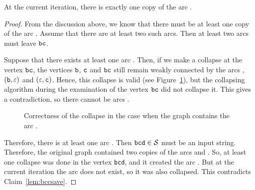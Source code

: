 \begin{lemma}
\label{lem:bbcone}
At the current iteration, there is exactly one copy of the arc .
\end{lemma}
\begin{proof}
From the discussion above, we know that there must be at least one copy of the arc . Assume that there are at least two such arcs. Then at least two arcs must leave $ {\tt bc} $.

Suppose that there exists at least one arc . Then, if we make a collapse at the vertex $ {\tt bc} $, the vertices $ {\tt b} $, $ {\tt c} $ and $ {\tt bc} $ still remain weakly connected by the arcs , $ ({\tt b}, \varepsilon) $ and $ (\varepsilon, {\tt c}) $. Hence, this collapse is valid (see Figure~\ref{fig:lvl1lemmabcc}), but the collapsing algorithm during the examination of the vertex $ {\tt bc} $ did not collapse it. This gives a contradiction, so there cannot be arcs .

\begin{figure}[ht]
\begin{center}

\end{center}

\caption{Correctness of the collapse in the case when the graph contains the arc .}\label{fig:lvl1lemmabcc}
\end{figure}

Therefore, there is at least one arc . Then $ {\tt bcd} \in {\cal S} $ must be an input string. Therefore, the original graph contained two copies of the arcs  and . So, at least one collapse was done in the vertex {\tt bcd}, and it created the arc . But at the current iteration the arc  does not exist, so it was also collapsed. This contradicts Claim~\ref{lem:bccsave}.
\end{proof}

